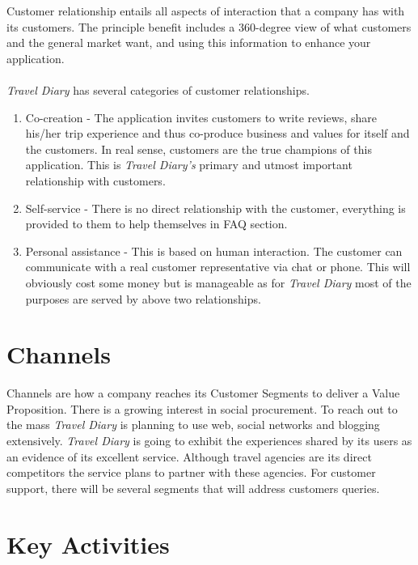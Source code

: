 \documentclass[IN,english]{tumbook}
\begin{document}
Customer relationship entails all aspects of interaction that a company has with its customers. The principle benefit includes a 360-degree view of what customers and the general market want, and using this information to enhance your application.\\
\\
\emph{Travel Diary} has several categories of customer relationships.

\begin{enumerate}
\item Co-creation - The application invites customers to write reviews, share his/her trip experience and thus co-produce business and values for itself and the customers. In real sense, customers are the true champions of this application. This is \emph{Travel Diary's} primary and utmost important relationship with customers.
\item Self-service - There is no direct relationship with the customer, everything is provided to them to help themselves in FAQ section.
\item Personal assistance - This is based on human interaction. The customer can communicate with a real customer representative via chat or phone. This will obviously cost some money but is manageable as for \emph{Travel Diary} most of the purposes are served by above two relationships.
\end{enumerate}

\section{Channels}

Channels are how a company reaches its Customer Segments to deliver a Value Proposition. There is a growing interest in social procurement. To reach out to the mass \emph{Travel Diary} is planning to use web, social networks and blogging extensively. \emph{Travel Diary} is going to exhibit the experiences shared by its users as an evidence of its excellent service. Although travel agencies are its direct competitors the service plans to partner with these agencies. For customer support, there will be several segments that will address customers queries.

\section{Key Activities}
\end{document}
